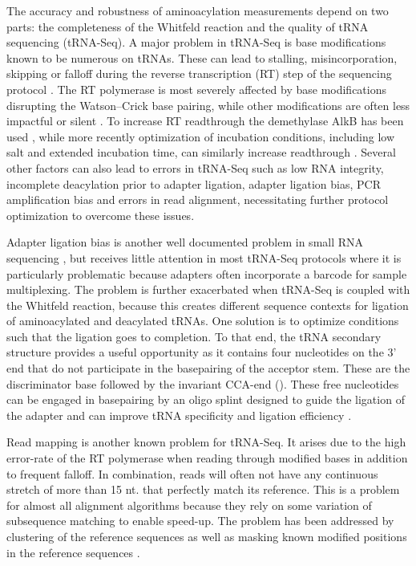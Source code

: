 \documentclass[9pt,lineno]{elife}
\begin{document}
The accuracy and robustness of aminoacylation measurements depend on two parts: the completeness of the Whitfeld reaction and the quality of tRNA sequencing (tRNA-Seq).
A major problem in tRNA-Seq is base modifications known to be numerous on tRNAs.
These can lead to stalling, misincorporation, skipping or falloff during the reverse transcription (RT) step of the sequencing protocol \citep{Motorin2007-nb}.
The RT polymerase is most severely affected by base modifications disrupting the Watson–Crick base pairing, while other modifications are often less impactful or silent \citep{Wang2021-fc, Sas-Chen2019-um}.
To increase RT readthrough the demethylase AlkB has been used \citep{Zheng2015-kj, Cozen2015-cx}, while more recently optimization of incubation conditions, including low salt and extended incubation time, can similarly increase readthrough \citep{Behrens2021-gb}.
Several other factors can also lead to errors in tRNA-Seq such as low RNA integrity, incomplete deacylation prior to adapter ligation, adapter ligation bias, PCR amplification bias and errors in read alignment, necessitating further protocol optimization to overcome these issues. 

Adapter ligation bias is another well documented problem in small RNA sequencing \citep{Fuchs2015-nb, Zhuang2012-nu}, but receives little attention in most tRNA-Seq protocols where it is particularly problematic because adapters often incorporate a barcode for sample multiplexing.
The problem is further exacerbated when tRNA-Seq is coupled with the Whitfeld reaction, because this creates different sequence contexts for ligation of aminoacylated and deacylated tRNAs.
One solution is to optimize conditions such that the ligation goes to completion.
To that end, the tRNA secondary structure provides a useful opportunity as it contains four nucleotides on the 3’ end that do not participate in the basepairing of the acceptor stem.
These are the discriminator base followed by the invariant CCA-end ().
These free nucleotides can be engaged in basepairing by an oligo splint designed to guide the ligation of the adapter and can improve tRNA specificity and ligation efficiency \citep{Shigematsu2017-tv, Smith2015-ht}.

Read mapping is another known problem for tRNA-Seq.
It arises due to the high error-rate of the RT polymerase when reading through modified bases in addition to frequent falloff.
In combination, reads will often not have any continuous stretch of more than 15 nt. that perfectly match its reference.
This is a problem for almost all alignment algorithms because they rely on some variation of subsequence matching to enable speed-up.
The problem has been addressed by clustering of the reference sequences \citep{Hoffmann2018-uz} as well as masking known modified positions in the reference sequences \citep{Behrens2021-gb}.
\end{document}
